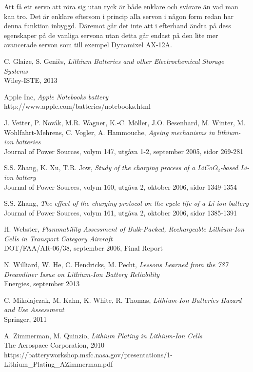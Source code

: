 \documentclass[a4paper,12pt]{article}
\begin{document}
Att få ett servo att röra sig utan ryck är både enklare och svårare än vad man kan tro. Det är enklare eftersom i princip alla servon i någon form redan har denna funktion inbyggd. Däremot går det inte att i efterhand ändra på dess egenskaper på de vanliga servona utan detta går endast på den lite mer avancerade servon som till exempel Dynamixel AX-12A. 

\newpage

\begin{thebibliography}{9}
 C. Glaize, S. Geniès, \emph{Lithium Batteries and other Electrochemical Storage Systems}\\ Wiley-ISTE, 2013

 Apple Inc, \emph{Apple Notebooks battery}
\\ http://www.apple.com/batteries/notebooks.html

 J. Vetter, P. Novák, M.R. Wagner, K.-C. Möller, J.O. Besenhard, M. Winter, M. Wohlfahrt-Mehrens, C. Vogler, A. Hammouche, \emph{Ageing mechanisms in lithium-ion batteries}
\\ Journal of Power Sources, volym 147, utgåva 1-2, september 2005, sidor 269-281

 S.S. Zhang, K. Xu, T.R. Jow, \emph{Study of the charging process of a LiCoO$_{2}$-based Li-ion battery}
\\ Journal of Power Sources, volym 160, utgåva 2, oktober 2006, sidor 1349-1354

 S.S. Zhang, \emph{The effect of the charging protocol on the cycle life of a Li-ion battery}
\\ Journal of Power Sources, volym 161, utgåva 2, oktober 2006, sidor 1385-1391

 H. Webster, \emph{Flammability Assessment of Bulk-Packed, Rechargeable Lithium-Ion Cells in Transport Category Aircraft}
\\DOT/FAA/AR-06/38, september 2006, Final Report

 N. Williard, W. He, C. Hendricks, M. Pecht, \emph{Lessons Learned from the 787 Dreamliner Issue on Lithium-Ion Battery Reliability}
\\Energies, september 2013

 C. Mikolajczak, M. Kahn, K. White, R. Thomas, \emph{Lithium-Ion Batteries Hazard and Use Assessment}
\\Springer, 2011

 A. Zimmerman, M. Quinzio, \emph{Lithium Plating in Lithium-Ion Cells}
\\The Aerospace Corporation, 2010
\\https://batteryworkshop.msfc.nasa.gov/presentations/1-Lithium\_Plating\_AZimmerman.pdf 


\end{thebibliography}
\end{document}
